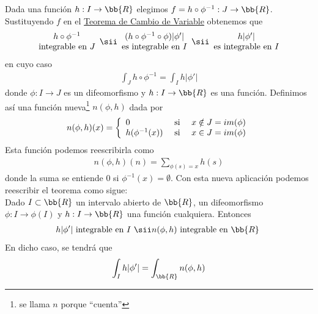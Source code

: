 Dada una función $h: I \to \bb{R}$ elegimos $f=h\circ \phi^{-1} : J \to \bb{R}$. Sustituyendo $f$ en el \hyperref[teo:cambio_variable]{Teorema de Cambio de Variable} obtenemos que 
\begin{gather*}
    \begin{array}{c}
        h\circ \phi^{-1} \\
        \text{integrable en $J$}
    \end{array} \sii
    \begin{array}{c}
        (h \circ \phi^{-1} \circ \phi)|\phi'|\\
        \text{es integrable en $I$}
    \end{array} \sii
    \begin{array}{c}
        h|\phi'|\\
        \text{es integrable en $I$}
    \end{array}
\end{gather*}
en cuyo caso 
\begin{gather*}
    \int_J h \circ \phi^{-1} = \int_I h|\phi'|
\end{gather*}
donde $\phi: I \to J$ es un difeomorfismo y $h:I \to \bb{R}$ es una función.
Definimos así una función nueva\footnote{se llama $n$ porque ``cuenta''} $n(\phi, h)$ dada por
\begin{gather*}
    n(\phi, h)(x) = \left\{
        \begin{array}{l c l}
            0 & \text{ si } & x\notin J = im(\phi)\\
            h(\phi^{-1}(x)) & \text{ si } & x\in J = im(\phi)
        \end{array}
    \right.
\end{gather*}
Esta función podemos reescribirla como 
\begin{gather*}
    n(\phi, h)(n) = \sum_{\phi(s)=x} h(s)
\end{gather*}
donde la suma se entiende $0$ si $\phi^{-1}(x)=\emptyset$. Con esta nueva aplicación podemos reescribir el teorema como sigue:\\

Dado $I \subset \bb{R}$ un intervalo abierto de $\bb{R}$, un difeomorfismo $\phi: I \to \phi(I)$ y $h:I \to \bb{R}$ una función cualquiera. Entonces 
\begin{gather*}
    h|\phi'| \text{ integrable en $I$ } \sii n(\phi, h) \text{ integrable en $\bb{R}$ }
\end{gather*}
En dicho caso, se tendrá que 
\begin{gather*}
    \int_I h|\phi'| = \int_\bb{R} n(\phi, h) 
\end{gather*}

